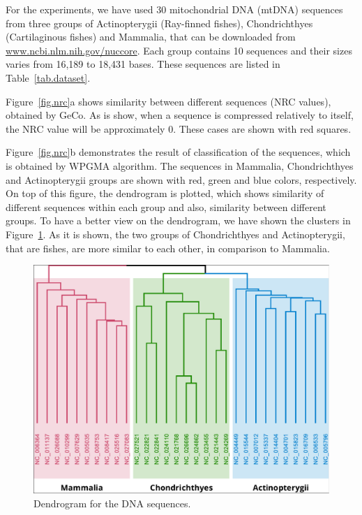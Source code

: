 \documentclass[extendedabs]{recpad2k}
\begin{document}
For the experiments, we have used 30 mitochondrial DNA (mtDNA) sequences from three groups of Actinopterygii (Ray-finned fishes), Chondrichthyes (Cartilaginous fishes) and Mammalia, that can be downloaded from \url{www.ncbi.nlm.nih.gov/nuccore}. Each group contains 10 sequences and their sizes varies from 16,189 to 18,431 bases. These sequences are listed in Table~\ref{tab.dataset}.

Figure~\ref{fig.nrc}a shows similarity between different sequences (NRC values), obtained by GeCo. As is show, when a sequence is compressed relatively to itself, the NRC value will be approximately 0. These cases are shown with red squares.

Figure~\ref{fig.nrc}b demonstrates the result of classification of the sequences, which is obtained by WPGMA algorithm. The sequences in Mammalia, Chondrichthyes and Actinopterygii groups are shown with red, green and blue colors, respectively. On top of this figure, the dendrogram is plotted, which shows similarity of different sequences within each group and also, similarity between different groups. To have a better view on the dendrogram, we have shown the clusters in Figure~\ref{fig.dend}. As it is shown, the two groups of Chondrichthyes and Actinopterygii, that are fishes, are more similar to each other, in comparison to Mammalia.

\begin{figure}[b!]
   \includegraphics[width=\linewidth]{fig_dend.pdf}
   \caption{Dendrogram for the DNA sequences.}
   \label{fig.dend}
\end{figure}
\end{document}
